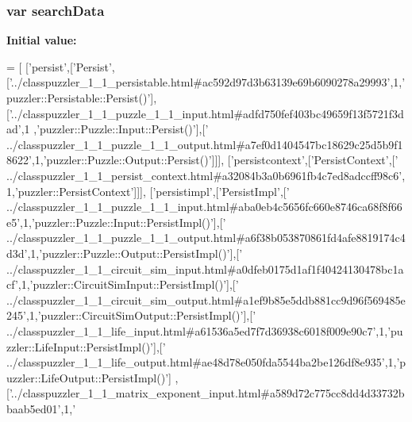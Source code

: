 \subsubsection[{search\+Data}]{\setlength{\rightskip}{0pt plus 5cm}var search\+Data}\label{a00092_ad01a7523f103d6242ef9b0451861231e}
{\bfseries Initial value\+:}
\begin{DoxyCode}
=
[
  [\textcolor{stringliteral}{'persist'},[\textcolor{stringliteral}{'Persist'},[\textcolor{stringliteral}{'../classpuzzler\_1\_1\_persistable.html#ac592d97d3b63139e69b6090278a29993'},1,\textcolor{stringliteral}{'
      puzzler::Persistable::Persist()'}],[\textcolor{stringliteral}{'../classpuzzler\_1\_1\_puzzle\_1\_1\_input.html#adfd750fef403bc49659f13f5721f3dad'},1
      ,\textcolor{stringliteral}{'puzzler::Puzzle::Input::Persist()'}],[\textcolor{stringliteral}{'
      ../classpuzzler\_1\_1\_puzzle\_1\_1\_output.html#a7ef0d1404547bc18629c25d5b9f18622'},1,\textcolor{stringliteral}{'puzzler::Puzzle::Output::Persist()'}]]],
  [\textcolor{stringliteral}{'persistcontext'},[\textcolor{stringliteral}{'PersistContext'},[\textcolor{stringliteral}{'
      ../classpuzzler\_1\_1\_persist\_context.html#a32084b3a0b6961fb4c7ed8adccff98c6'},1,\textcolor{stringliteral}{'puzzler::PersistContext'}]]],
  [\textcolor{stringliteral}{'persistimpl'},[\textcolor{stringliteral}{'PersistImpl'},[\textcolor{stringliteral}{'
      ../classpuzzler\_1\_1\_puzzle\_1\_1\_input.html#aba0eb4c5656fc660e8746ca68f8f66e5'},1,\textcolor{stringliteral}{'puzzler::Puzzle::Input::PersistImpl()'}],[\textcolor{stringliteral}{'
      ../classpuzzler\_1\_1\_puzzle\_1\_1\_output.html#a6f38b053870861fd4afe8819174c4d3d'},1,\textcolor{stringliteral}{'puzzler::Puzzle::Output::PersistImpl()'}],[\textcolor{stringliteral}{'
      ../classpuzzler\_1\_1\_circuit\_sim\_input.html#a0dfeb0175d1af1f40424130478bc1acf'},1,\textcolor{stringliteral}{'puzzler::CircuitSimInput::PersistImpl()'}],[\textcolor{stringliteral}{'
      ../classpuzzler\_1\_1\_circuit\_sim\_output.html#a1ef9b85e5ddb881cc9d96f569485e245'},1,\textcolor{stringliteral}{'puzzler::CircuitSimOutput::PersistImpl()'}],[\textcolor{stringliteral}{'
      ../classpuzzler\_1\_1\_life\_input.html#a61536a5ed7f7d36938c6018f009e90c7'},1,\textcolor{stringliteral}{'puzzler::LifeInput::PersistImpl()'}],[\textcolor{stringliteral}{'
      ../classpuzzler\_1\_1\_life\_output.html#ae48d78e050fda5544ba2be126df8e935'},1,\textcolor{stringliteral}{'puzzler::LifeOutput::PersistImpl()'}]
      ,[\textcolor{stringliteral}{'../classpuzzler\_1\_1\_matrix\_exponent\_input.html#a589d72c775cc8dd4d33732bbaab5ed01'},1,\textcolor{stringliteral}{'
}
\end{DoxyCode}
